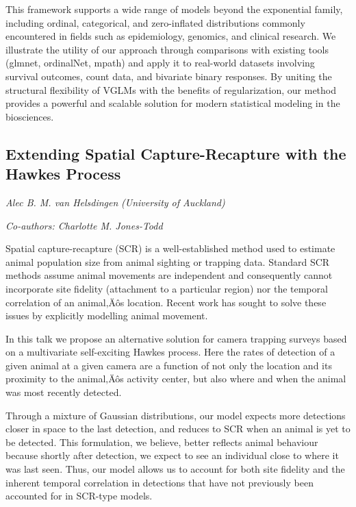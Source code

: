 \documentclass[
]{scrreprt}
\begin{document}
This framework supports a wide range of models beyond the exponential
family, including ordinal, categorical, and zero-inflated distributions
commonly encountered in fields such as epidemiology, genomics, and
clinical research. We illustrate the utility of our approach through
comparisons with existing tools (glmnet, ordinalNet, mpath) and apply it
to real-world datasets involving survival outcomes, count data, and
bivariate binary responses. By uniting the structural flexibility of
VGLMs with the benefits of regularization, our method provides a
powerful and scalable solution for modern statistical modeling in the
biosciences.

\subsection{Extending Spatial Capture-Recapture with the Hawkes
Process}\label{extending-spatial-capture-recapture-with-the-hawkes-process}

\emph{Alec B. M. van Helsdingen}
\emph{(University of Auckland)}

\emph{Co-authors: Charlotte M. Jones-Todd}

\setlength{\parskip}{0.5em}

Spatial capture-recapture (SCR) is a well-established method used to
estimate animal population size from animal sighting or trapping data.
Standard SCR methods assume animal movements are independent and
consequently cannot incorporate site fidelity (attachment to a
particular region) nor the temporal correlation of an animal‚Äôs
location. Recent work has sought to solve these issues by explicitly
modelling animal movement.

In this talk we propose an alternative solution for camera trapping
surveys based on a multivariate self-exciting Hawkes process. Here the
rates of detection of a given animal at a given camera are a function of
not only the location and its proximity to the animal‚Äôs activity
center, but also where and when the animal was most recently detected.

Through a mixture of Gaussian distributions, our model expects more
detections closer in space to the last detection, and reduces to SCR
when an animal is yet to be detected. This formulation, we believe,
better reflects animal behaviour because shortly after detection, we
expect to see an individual close to where it was last seen. Thus, our
model allows us to account for both site fidelity and the inherent
temporal correlation in detections that have not previously been
accounted for in SCR-type models.
\end{document}
